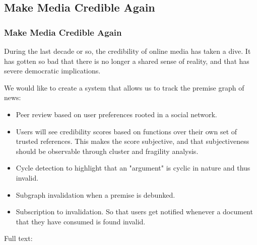 \subsection{Make Media Credible Again}
\begin{frame}
    \frametitle{Make Media Credible Again}
    \vspace{0mm}
    During the last decade or so, the credibility of online media has taken a dive. It has gotten so bad that there is no longer a shared sense of reality, and that has severe democratic implications.
    
    \vspace{3mm}
    We would like to create a system that allows us to track the premise graph of news:
    \begin{itemize}
      \item Peer review based on user preferences rooted in a social network.
      \item Users will see credibility scores based on functions over their own set of trusted references. This makes the score subjective, and that subjectiveness should be observable through cluster and fragility analysis.
      \item Cycle detection to highlight that an "argument" is cyclic in nature and thus invalid.
      \item Subgraph invalidation when a premise is debunked.
      \item Subscription to invalidation. So that users get notified whenever a document that they have consumed is found invalid.
    \end{itemize}

    \vspace{3mm}
    Full text: 
\end{frame}

